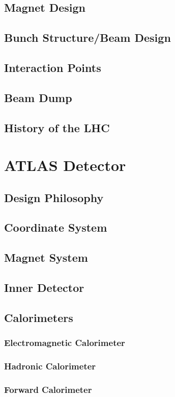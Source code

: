 \subsection{Magnet Design}
\subsection{Bunch Structure/Beam Design}
\subsection{Interaction Points}
\subsection{Beam Dump}
\subsection{History of the LHC}

\section{ATLAS Detector}
\subsection{Design Philosophy}
\subsection{Coordinate System}
\subsection{Magnet System}
\subsection{Inner Detector}
\subsection{Calorimeters}
\subsubsection{Electromagnetic Calorimeter}
\subsubsection{Hadronic Calorimeter}
\subsubsection{Forward Calorimeter}
